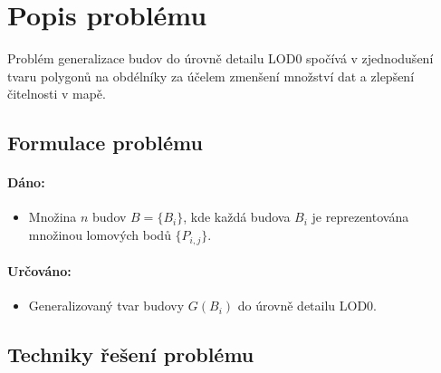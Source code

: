 \section{Popis problému}

Problém generalizace budov do úrovně detailu LOD0 spočívá v zjednodušení tvaru polygonů na obdélníky za účelem zmenšení množství dat a zlepšení čitelnosti v mapě.

\subsection{Formulace problému}

\paragraph{Dáno:}
\begin{itemize}
    \item Množina \( n \) budov \( B = \{B_i\} \), kde každá budova \( B_i \) je reprezentována množinou lomových bodů \( \{P_{i,j}\} \).
\end{itemize}

\paragraph{Určováno:}
\begin{itemize}
    \item Generalizovaný tvar budovy \( G(B_i) \) do úrovně detailu LOD0.
\end{itemize}

\subsection{Techniky řešení problému}

